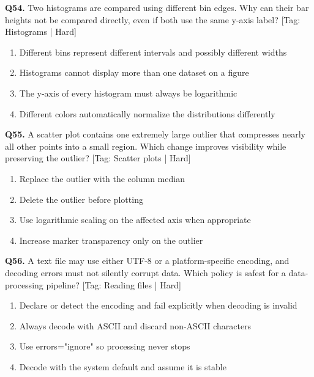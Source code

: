 \vspace{2mm}
\noindent\textbf{Q54.} Two histograms are compared using different bin edges. Why can their bar heights not be compared directly, even if both use the same y-axis label? \hfill [Tag: Histograms | Hard]
\begin{enumerate}[label=(\alph*),topsep=2pt,itemsep=1pt,partopsep=0pt,parsep=0pt]
    \item {Different bins represent different intervals and possibly different widths}
    \item {Histograms cannot display more than one dataset on a figure}
    \item {The y-axis of every histogram must always be logarithmic}
    \item {Different colors automatically normalize the distributions differently}
\end{enumerate}
\vspace{2mm}
\noindent\textbf{Q55.} A scatter plot contains one extremely large outlier that compresses nearly all other points into a small region. Which change improves visibility while preserving the outlier? \hfill [Tag: Scatter plots | Hard]
\begin{enumerate}[label=(\alph*),topsep=2pt,itemsep=1pt,partopsep=0pt,parsep=0pt]
    \item {Replace the outlier with the column median}
    \item {Delete the outlier before plotting}
    \item {Use logarithmic scaling on the affected axis when appropriate}
    \item {Increase marker transparency only on the outlier}
\end{enumerate}
\vspace{2mm}
\noindent\textbf{Q56.} A text file may use either UTF-8 or a platform-specific encoding, and decoding errors must not silently corrupt data. Which policy is safest for a data-processing pipeline? \hfill [Tag: Reading files | Hard]
\begin{enumerate}[label=(\alph*),topsep=2pt,itemsep=1pt,partopsep=0pt,parsep=0pt]
    \item {Declare or detect the encoding and fail explicitly when decoding is invalid}
    \item {Always decode with ASCII and discard non-ASCII characters}
    \item {Use errors="ignore" so processing never stops}
    \item {Decode with the system default and assume it is stable}
\end{enumerate}
